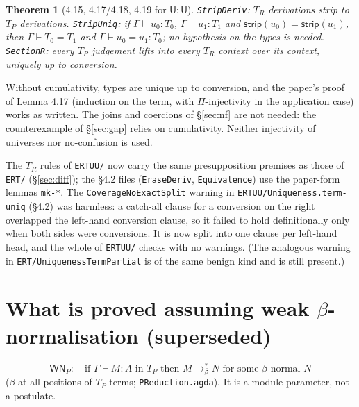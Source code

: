 \documentclass[10pt]{article}
\newcommand{\U}{\mathsf{U}}
\newcommand{\strip}{\mathsf{strip}}
\newcommand{\TR}{T_R}
\newcommand{\TP}{T_P}
\newcommand{\WN}{\mathsf{WN}_P}
\newcommand{\agda}[1]{\texttt{#1}}
\newtheorem{theorem}{Theorem}
\theoremstyle{remark}
\begin{document}
\begin{theorem}[4.15, 4.17/4.18, 4.19 for $\U:\U$]
\agda{StripDeriv}: $\TR$ derivations strip to $\TP$ derivations.
\agda{StripUniq}: if $\Gamma\vdash u_0:T_0$, $\Gamma\vdash u_1:T_1$ and
$\strip(u_0)=\strip(u_1)$, then $\Gamma\vdash T_0=T_1$ and
$\Gamma\vdash u_0=u_1:T_0$; no hypothesis on the types is needed.
\agda{SectionR}: every $\TP$ judgement lifts into every $\TR$ context
over its context, uniquely up to conversion.
\end{theorem}
\noindent
Without cumulativity, types are unique up to conversion, and the paper's
proof of Lemma 4.17 (induction on the term, with $\Pi$-injectivity in the
application case) works as written.  The joins and coercions of
\S\ref{sec:nf} are not needed: the counterexample of \S\ref{sec:gap}
relies on cumulativity.  Neither injectivity of universes nor
no-confusion is used.

The $\TR$ rules of \texttt{ERTUU/} now carry the same presupposition
premises as those of \texttt{ERT/} (\S\ref{sec:diff}); the §4.2 files
(\agda{EraseDeriv}, \agda{Equivalence}) use the paper-form lemmas
\agda{mk-*}.  The \texttt{CoverageNoExactSplit} warning in
\agda{ERTUU/Uniqueness.term-uniq} (§4.2) was harmless: a catch-all
clause for a conversion on the right overlapped the left-hand conversion
clause, so it failed to hold definitionally only when both sides were
conversions.  It is now split into one clause per left-hand head, and
the whole of \texttt{ERTUU/} checks with no warnings.  (The analogous
warning in \agda{ERT/UniquenessTermPartial} is of the same benign
kind and is still present.)

\section{What is proved assuming weak $\beta$-normalisation (superseded)}\label{sec:wn}

\[
\WN:\quad \text{if } \Gamma\vdash M:A \text{ in } \TP \text{ then }
M\to^*_\beta N \text{ for some } \beta\text{-normal } N
\]
($\beta$ at all positions of $\TP$ terms; \agda{PReduction.agda}).  It is a
module parameter, not a postulate.
\end{document}
